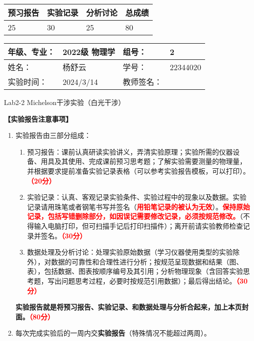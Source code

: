 \documentclass[dvipsnames, svgnames,a4paper,11pt]{article}
\begin{document}
	
	
	
	
	\begin{table}
		\renewcommand\arraystretch{1.7}
		\begin{tabularx}{\textwidth}{
				|X|X|X|X
				|X|X|X|X|}
			\hline
			\multicolumn{2}{|c|}{预习报告}&\multicolumn{2}{|c|}{实验记录}&\multicolumn{2}{|c|}{分析讨论}&\multicolumn{2}{|c|}{总成绩}\\
			\hline
			\LARGE25 & & \LARGE30 & & \LARGE25 & & \LARGE80 & \\
			\hline
		\end{tabularx}
	\end{table}
	
	\begin{table}
		\renewcommand\arraystretch{1.7}
		\begin{tabularx}{\textwidth}{|X|X|X|X|}
			\hline
			年级、专业： & 2022级 物理学 &组号： & 2\\
			\hline
			姓名： & 杨舒云  & 学号： & 22344020\\
			\hline
			实验时间： & 2024/3/14 & 教师签名： & \\
			\hline
		\end{tabularx}
	\end{table}
	
	\begin{center}
		\LARGE Lab2-2 \quad Michelson干涉实验（白光干涉）
	\end{center}
	
	
	\textbf{【实验报告注意事项】}
	\begin{enumerate}
		\item 实验报告由三部分组成：
		\begin{enumerate}
			\item 预习报告：课前认真研读实验讲义，弄清实验原理；实验所需的仪器设备、用具及其使用、完成课前预习思考题；了解实验需要测量的物理量，并根据要求提前准备实验记录表格（可以参考实验报告模板，可以打印）。\textcolor{red}{\textbf{（20分）}}
			\item 实验记录：认真、客观记录实验条件、实验过程中的现象以及数据。实验记录请用珠笔或者钢笔书写并签名（\textcolor{red}{\textbf{用铅笔记录的被认为无效}}）。\textcolor{red}{\textbf{保持原始记录，包括写错删除部分，如因误记需要修改记录，必须按规范修改。}}（不得输入电脑打印，但可扫描手记后打印扫描件）；离开前请实验教师检查记录并签名。\textcolor{red}{\textbf{（30分）}}
			\item 数据处理及分析讨论：处理实验原始数据（学习仪器使用类型的实验除外），对数据的可靠性和合理性进行分析；按规范呈现数据和结果（图、表），包括数据、图表按顺序编号及其引用；分析物理现象（含回答实验思考题，写出问题思考过程，必要时按规范引用数据）；最后得出结论。\textcolor{red}{\textbf{（30分）}}
		\end{enumerate}
		\textbf{实验报告就是将预习报告、实验记录、和数据处理与分析合起来，加上本页封面。\textcolor{red}{（80分）}}
		\item 每次完成实验后的一周内交\textbf{实验报告}（特殊情况不能超过两周）。
	\end{enumerate}
	
\end{document}
